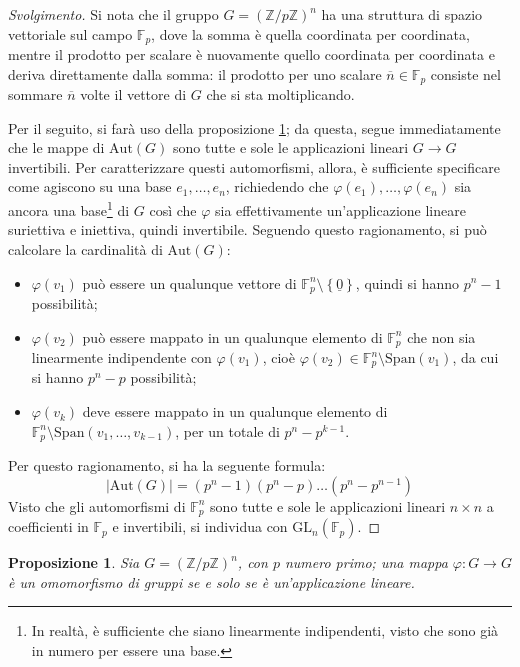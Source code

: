 \documentclass[11pt]{scrartcl}
\theoremstyle{style}
\newtheorem{prop}{Proposizione}[section]
\newenvironment{svolgimento}{\renewcommand\qedsymbol{$\blacksquare$}\begin{proof}[Svolgimento]}{\end{proof}}
\numberwithin{equation}{subsection}
\begin{document}
\begin{svolgimento}
	Si nota che il gruppo $G = (\mathbb{Z}/p\mathbb{Z})^n$ ha una struttura di spazio vettoriale sul campo $\mathbb{F}_p$, dove la somma \`e quella coordinata per coordinata, mentre il prodotto per scalare \`e nuovamente quello coordinata per coordinata e deriva direttamente dalla somma: il prodotto per uno scalare $\overline{n} \in \mathbb{F}_p$ consiste nel sommare $\overline{n}$ volte il vettore di $G$ che si sta moltiplicando.

	Per il seguito, si far\`a uso della proposizione \ref{homlin}; da questa, segue immediatamente che le mappe di $\mathrm{Aut} (G)$ sono tutte e sole le applicazioni lineari $G \to G$ invertibili.
	Per caratterizzare questi automorfismi, allora, \`e sufficiente specificare come agiscono su una base $e_1, \ldots, e_n$, richiedendo che $\varphi (e_1),\ldots, \varphi (e_n)$ sia ancora una base\footnote{In realt\`a, \`e sufficiente che siano linearmente indipendenti, visto che sono gi\`a in numero per essere una base.} di $G$ cos\`i che $\varphi $ sia effettivamente un'applicazione lineare suriettiva e iniettiva, quindi invertibile.
	Seguendo questo ragionamento, si pu\`o calcolare la cardinalit\`a di $\mathrm{Aut} (G)$:
	\begin{itemize}
		\item $\varphi (v_1)$ pu\`o essere un qualunque vettore di $\mathbb{F}_p^n \setminus \left\{ \underline{0} \right\} $, quindi si hanno $p^{n}-1$ possibilit\`a;
		\item $\varphi (v_2)$ pu\`o essere mappato in un qualunque elemento di $\mathbb{F}_p^n$ che non sia linearmente indipendente con $\varphi (v_1)$, cio\`e $\varphi (v_2) \in \mathbb{F}_p^n \setminus \mathrm{Span} (v_1)$, da cui si hanno $p^n - p$ possibilit\`a;
		\item $\varphi (v_k)$ deve essere mappato in un qualunque elemento di $\mathbb{F}_p^n \setminus \mathrm{Span} (v_1,\ldots,v_{k-1} )$, per un totale di $p^n - p^{k-1}$.
	\end{itemize}
	Per questo ragionamento, si ha la seguente formula:
	\begin{equation}
		\lvert \mathrm{Aut} (G) \rvert = (p^n - 1) (p^n - p) \ldots (p^n - p^{n-1})
	\end{equation}
	Visto che gli automorfismi di $\mathbb{F}_p^n$ sono tutte e sole le applicazioni lineari $n \times n$ a coefficienti in $\mathbb{F}_p$ e invertibili, si individua con $\mathrm{GL} _n(\mathbb{F}_p)$.
\end{svolgimento}
\begin{prop}
	\label{homlin}
Sia $G = (\mathbb{Z}/p\mathbb{Z})^n$, con $p$ numero primo; una mappa $\varphi  : G \to G$ \`e un omomorfismo di gruppi se e solo se \`e un'applicazione lineare.
\end{prop}
\end{document}
